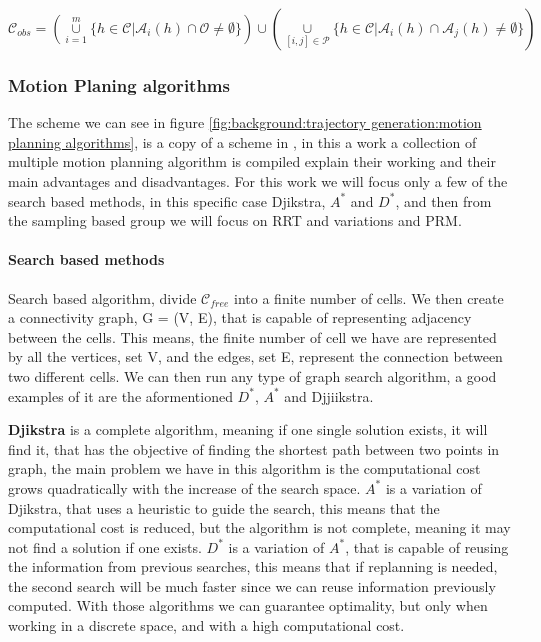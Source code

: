 \begin{equation}
    \mathcal{C}_{obs} = \left( \overset{m}{\underset{i=1}{\cup}}\{h \in \mathcal{C} \vert \mathcal{A}_i(h) \cap \mathcal{O} \neq \emptyset \} \right) \cup \left( \underset{[i, j] \in \mathcal{P}}{\cup} \{ h \in \mathcal{C} \vert \mathcal{A}_i(h) \cap \mathcal{A}_j(h) \neq \emptyset\}  \right)
    \label{eq:background:trajectory generation:obstacle space}
\end{equation}



\subsubsection{Motion Planing algorithms}

The scheme we can see in figure \ref{fig:background:trajectory generation:motion planning algorithms}, is a copy of a scheme in \cite{InesBatista2022Thesis}, in this a work a collection of multiple motion planning algorithm is compiled explain their working and their main advantages and disadvantages. For this work we will focus only a few of the search based methods, in this specific case Djikstra, $A^{*}$ and $D^{*}$, and then from the sampling based group we will focus on RRT and variations and PRM.

\paragraph{Search based methods}

Search based algorithm\cite{latombe2012robot}, divide $\mathcal{C}_{free}$ into a finite number of cells. We then create a connectivity graph, G = (V, E), that is capable of representing adjacency between the cells. This means, the finite number of cell we have are represented by all the vertices, set V, and the edges, set E, represent the connection between two different cells. We can then run any type of graph search algorithm, a good examples of it are the aformentioned $D^{*}$, $A^{*}$ \cite{A-start-original} and Djjiikstra\cite{dijkstra2022note}.

\textbf{Djikstra} is a complete algorithm, meaning if one single solution exists, it will find it, that has the objective of finding the shortest path between two points in graph, the main problem we have in this algorithm is the computational cost grows quadratically with the increase of the search space. \textbf{$A^{*}$} is a variation of Djikstra, that uses a heuristic to guide the search, this means that the computational cost is reduced, but the algorithm is not complete, meaning it may not find a solution if one exists. \textbf{$D^{*}$} is a variation of $A^{*}$, that is capable of reusing the information from previous searches, this means that if replanning is needed, the second search will be much faster since we can reuse information previously computed. With those algorithms we can guarantee optimality, but only when working in a discrete space, and with a high computational cost. 

